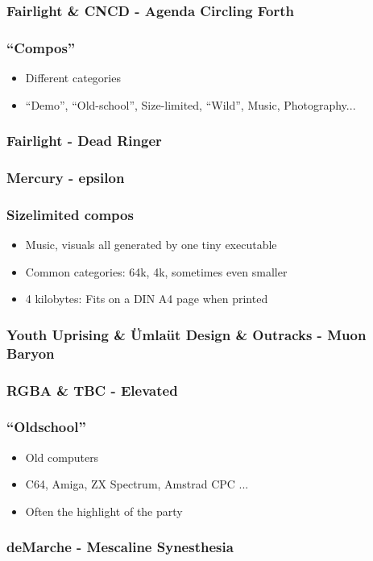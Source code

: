 \documentclass[t,14pt,aspectratio=169]{beamer}
\begin{document}
\begin{frame}
\frametitle{Fairlight \& CNCD - Agenda Circling Forth}
\end{frame}

\begin{frame}
\frametitle{``Compos''}
\begin{itemize}
\item Different categories
\item ``Demo'', ``Old-school'', Size-limited, ``Wild'', Music, Photography...
\end{itemize}
\end{frame}

\begin{frame}
\frametitle{Fairlight - Dead Ringer}
\end{frame}

\begin{frame}
\frametitle{Mercury - epsilon}
\end{frame}

\begin{frame}
\frametitle{Sizelimited compos}
\begin{itemize}
\item Music, visuals all generated by one tiny executable
\item Common categories: 64k, 4k, sometimes even smaller
\item 4 kilobytes: Fits on a DIN A4 page when printed
\end{itemize}
\end{frame}

\begin{frame}
\frametitle{Youth Uprising \& Ümlaüt Design \& Outracks - Muon Baryon}
\end{frame}

\begin{frame}
\frametitle{RGBA \& TBC - Elevated}
\end{frame}

\begin{frame}
\frametitle{``Oldschool''}
\begin{itemize}
\item Old computers
\item C64, Amiga, ZX Spectrum, Amstrad CPC ...
\item Often the highlight of the party
\end{itemize}
\end{frame}

\begin{frame}
\frametitle{deMarche - Mescaline Synesthesia}
\end{frame}
\end{document}
